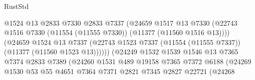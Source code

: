 \begin{lexlean}{RustStd}
\begin{coremodule}
                                          @1524
                                          @13
                                          @2833
                                          @7330
                                          @2833
                                          @7337
                                          (@24659
                                            @1517
                                            @13
                                            @7330
                                            (@22743
                                              @1516
                                              @7330
                                              (@11554 (@11555 @7330))
                                              (@11377 (@11560 @1516 @13))))
                                          (@24659
                                            @1524
                                            @13
                                            @7337
                                            (@22743
                                              @1523
                                              @7337
                                              (@11554 (@11555 @7337))
                                              (@11377 (@11560 @1523 @13))))))
                                      (@24249
                                        @1532
                                        @1539
                                        @1546
                                        @13
                                        @7365
                                        @7374
                                        @2833
                                        @7389
                                        (@24260
                                          @1531
                                          @489
                                          @19158
                                          @7365
                                          @7372
                                          @6188
                                          (@24269
                                            @1530
                                            @53
                                            @55
                                            @4651
                                            @7364
                                            @7371
                                            @2821
                                            @7345
                                            @2827
                                            @22721
                                            (@24268

\end{coremodule}
\end{lexlean}

